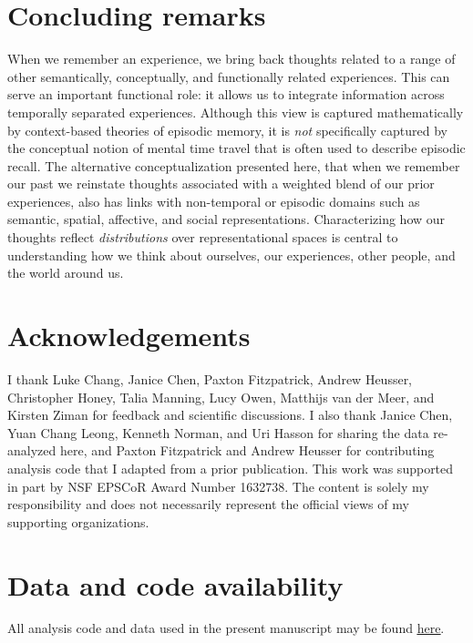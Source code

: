 \documentclass{article}
\begin{document}
\section*{Concluding remarks}
When we remember an experience, we bring back thoughts related to a range of other semantically, conceptually, and functionally related experiences.  This can serve an important functional role: it allows us to integrate information across temporally separated experiences.  Although this view is captured mathematically by context-based theories of episodic memory, it is \textit{not} specifically captured by the conceptual notion of mental time travel that is often used to describe episodic recall.  The alternative conceptualization presented here, that when we remember our past we reinstate thoughts associated with a weighted blend of our prior experiences, also has links with non-temporal or episodic domains such as semantic, spatial, affective, and social representations.  Characterizing how our thoughts reflect \textit{distributions} over representational spaces is central to understanding how we think about ourselves, our experiences, other people, and the world around us.

\section*{Acknowledgements}
I thank Luke Chang, Janice Chen, Paxton Fitzpatrick, Andrew Heusser, Christopher Honey, Talia Manning, Lucy Owen, Matthijs van der Meer, and Kirsten Ziman for feedback and scientific discussions. I also thank Janice Chen, Yuan Chang Leong, Kenneth Norman, and Uri Hasson for sharing the data re-analyzed here, and Paxton Fitzpatrick and Andrew Heusser for contributing analysis code that I adapted from a prior publication.  This work was supported in part by NSF EPSCoR Award Number 1632738. The content is solely my responsibility and does not necessarily represent the official views of my supporting organizations.

\section*{Data and code availability}
All analysis code and data used in the present manuscript may be found \href{https://github.com/ContextLab/mental-time-travel-paper}{\underline{here}}.



\end{document}

